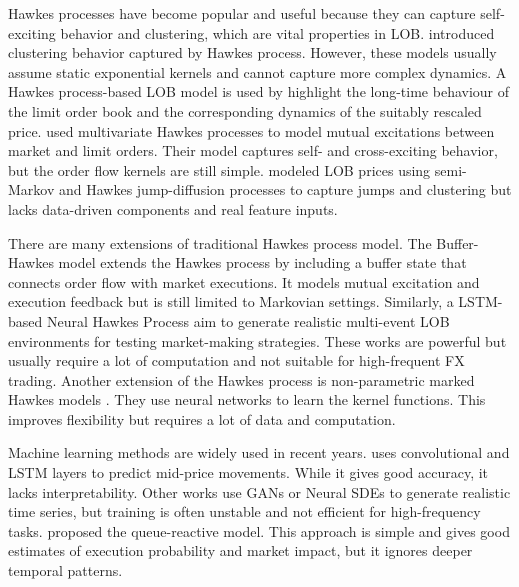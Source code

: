 Hawkes processes have become popular and useful because they can capture self-exciting behavior and clustering, which are vital properties in LOB. \cite{fonseca_clustering_2015} introduced clustering behavior captured by Hawkes process. However, these models usually assume static exponential kernels and cannot capture more complex dynamics. A Hawkes process-based LOB model is used by \cite{abergel_long-time_2015} highlight the long-time behaviour of the limit order book and the corresponding dynamics of the suitably rescaled price. \cite{zheng_ergodicity_2013} used multivariate Hawkes processes to model mutual excitations between market and limit orders. Their model captures self- and cross-exciting behavior, but the order flow kernels are still simple. \cite{lalor_algorithmic_2025} modeled LOB prices using semi-Markov and Hawkes jump-diffusion processes to capture jumps and clustering but lacks data-driven components and real feature inputs.


There are many extensions of traditional Hawkes process model. The Buffer-Hawkes model \citep{kaj_buffer_2017} extends the Hawkes process by including a buffer state that connects order flow with market executions. It models mutual excitation and execution feedback but is still limited to Markovian settings. Similarly, a LSTM-based Neural Hawkes Process \citep{lalor_event-based_2025} aim to generate realistic multi-event LOB environments for testing market-making strategies. These works are powerful but usually require a lot of computation and not suitable for high-frequent FX trading. Another extension of the Hawkes process is non-parametric marked Hawkes models \citep{joseph_non-parametric_2024}. They use neural networks to learn the kernel functions. This improves flexibility but requires a lot of data and computation.

\cite{coletta2021towards}
Machine learning methods are widely used in recent years. \cite{briola_deep_2024} uses convolutional and LSTM layers to predict mid-price movements. While it gives good accuracy, it lacks interpretability. Other works use GANs \citep{brophy_quick_2019} or Neural SDEs \citep{issa_non-adversarial_2023} to generate realistic time series, but training is often unstable and not efficient for high-frequency tasks. \cite{huang_simulating_2014} proposed the queue-reactive model. This approach is simple and gives good estimates of execution probability and market impact, but it ignores deeper temporal patterns.

